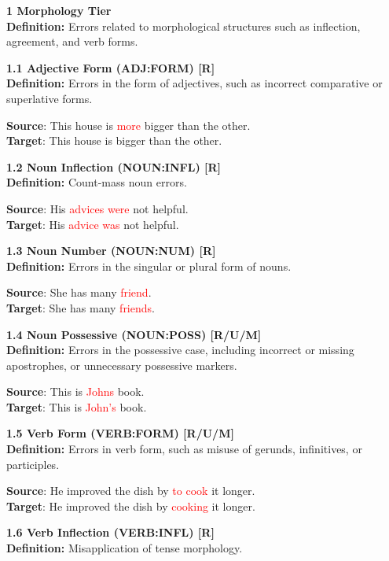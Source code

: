 \begin{tcolorbox}[breakable]
\noindent \textbf{1 Morphology Tier}\\
\textbf{Definition:} Errors related to morphological structures such as inflection, agreement, and verb forms.

\noindent \textbf{1.1 Adjective Form (ADJ:FORM) [R]}\\
\textbf{Definition:} Errors in the form of adjectives, such as incorrect comparative or superlative forms.


\textbf{Source}: This house is \textcolor{red}{more} bigger than the other. \\
\textbf{Target}: This house is bigger than the other.


\noindent \textbf{1.2 Noun Inflection (NOUN:INFL) [R]}\\
\textbf{Definition:} Count-mass noun errors.


\textbf{Source}: His \textcolor{red}{advices were} not helpful. \\
\textbf{Target}: His \textcolor{red}{advice was} not helpful.


\noindent \textbf{1.3 Noun Number (NOUN:NUM) [R]}\\
\textbf{Definition:} Errors in the singular or plural form of nouns.


\textbf{Source}: She has many \textcolor{red}{friend}. \\
\textbf{Target}: She has many \textcolor{red}{friends}.


\noindent \textbf{1.4 Noun Possessive (NOUN:POSS) [R/U/M]}\\
\textbf{Definition:} Errors in the possessive case, including incorrect or missing apostrophes, or unnecessary possessive markers.


\textbf{Source}: This is \textcolor{red}{Johns} book. \\
\textbf{Target}: This is \textcolor{red}{John's} book.


\noindent \textbf{1.5 Verb Form (VERB:FORM) [R/U/M]}\\
\textbf{Definition:} Errors in verb form, such as misuse of gerunds, infinitives, or participles.


\textbf{Source}: He improved the dish by \textcolor{red}{to cook} it longer. \\
\textbf{Target}: He improved the dish by \textcolor{red}{cooking} it longer.


\noindent \textbf{1.6 Verb Inflection (VERB:INFL) [R]}\\
\textbf{Definition:} Misapplication of tense morphology.



\end{tcolorbox}

